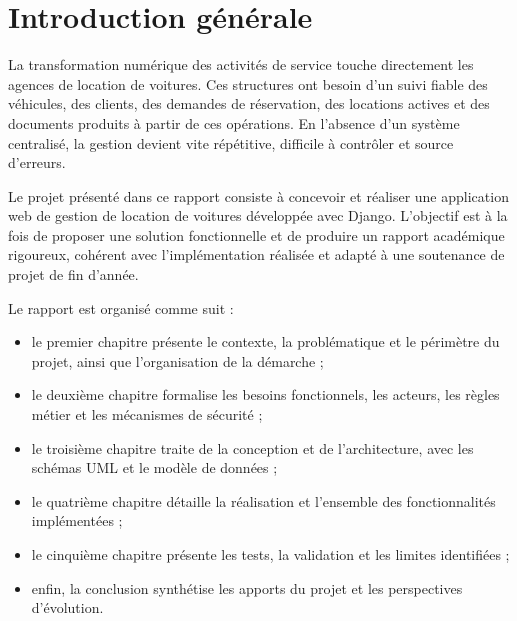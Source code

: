 \chapter*{Introduction générale}

La transformation numérique des activités de service touche directement les agences de location de voitures. Ces structures ont besoin d'un suivi fiable des véhicules, des clients, des demandes de réservation, des locations actives et des documents produits à partir de ces opérations. En l'absence d'un système centralisé, la gestion devient vite répétitive, difficile à contrôler et source d'erreurs.

Le projet présenté dans ce rapport consiste à concevoir et réaliser une application web de gestion de location de voitures développée avec Django. L'objectif est à la fois de proposer une solution fonctionnelle et de produire un rapport académique rigoureux, cohérent avec l'implémentation réalisée et adapté à une soutenance de projet de fin d'année.

Le rapport est organisé comme suit :
\begin{itemize}
  \item le premier chapitre présente le contexte, la problématique et le périmètre du projet, ainsi que l'organisation de la démarche ;
  \item le deuxième chapitre formalise les besoins fonctionnels, les acteurs, les règles métier et les mécanismes de sécurité ;
  \item le troisième chapitre traite de la conception et de l'architecture, avec les schémas UML et le modèle de données ;
  \item le quatrième chapitre détaille la réalisation et l'ensemble des fonctionnalités implémentées ;
  \item le cinquième chapitre présente les tests, la validation et les limites identifiées ;
  \item enfin, la conclusion synthétise les apports du projet et les perspectives d'évolution.
\end{itemize}
\clearpage

